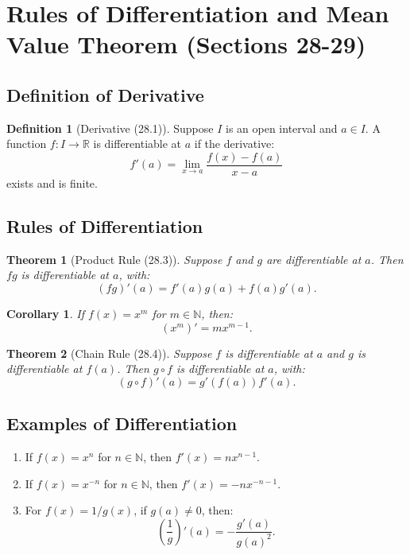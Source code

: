 \documentclass[9pt]{article}
\theoremstyle{definition}
\newtheorem{definition}{Definition}
\theoremstyle{plain}
\newtheorem{theorem}{Theorem}
\newtheorem{corollary}{Corollary}
\begin{document}
\section*{Rules of Differentiation and Mean Value Theorem (Sections 28-29)}

\subsection*{Definition of Derivative}
\begin{definition}[Derivative (28.1)]
Suppose \( I \) is an open interval and \( a \in I \). A function \( f : I \to \mathbb{R} \) is differentiable at \( a \) if the derivative:
\[
f'(a) = \lim_{x \to a} \frac{f(x) - f(a)}{x - a}
\]
exists and is finite.
\end{definition}

\subsection*{Rules of Differentiation}
\begin{theorem}[Product Rule (28.3)]
Suppose \( f \) and \( g \) are differentiable at \( a \). Then \( fg \) is differentiable at \( a \), with:
\[
(fg)'(a) = f'(a)g(a) + f(a)g'(a).
\]
\end{theorem}

\begin{corollary}
If \( f(x) = x^m \) for \( m \in \mathbb{N} \), then:
\[
(x^m)' = mx^{m-1}.
\]
\end{corollary}

\begin{theorem}[Chain Rule (28.4)]
Suppose \( f \) is differentiable at \( a \) and \( g \) is differentiable at \( f(a) \). Then \( g \circ f \) is differentiable at \( a \), with:
\[
(g \circ f)'(a) = g'(f(a))f'(a).
\]
\end{theorem}

\subsection*{Examples of Differentiation}
\begin{enumerate}
    \item If \( f(x) = x^n \) for \( n \in \mathbb{N} \), then \( f'(x) = nx^{n-1} \).
    \item If \( f(x) = x^{-n} \) for \( n \in \mathbb{N} \), then \( f'(x) = -nx^{-n-1} \).
    \item For \( f(x) = 1/g(x) \), if \( g(a) \neq 0 \), then:
    \[
    \left( \frac{1}{g} \right)'(a) = -\frac{g'(a)}{g(a)^2}.
    \]
\end{enumerate}
\end{document}
